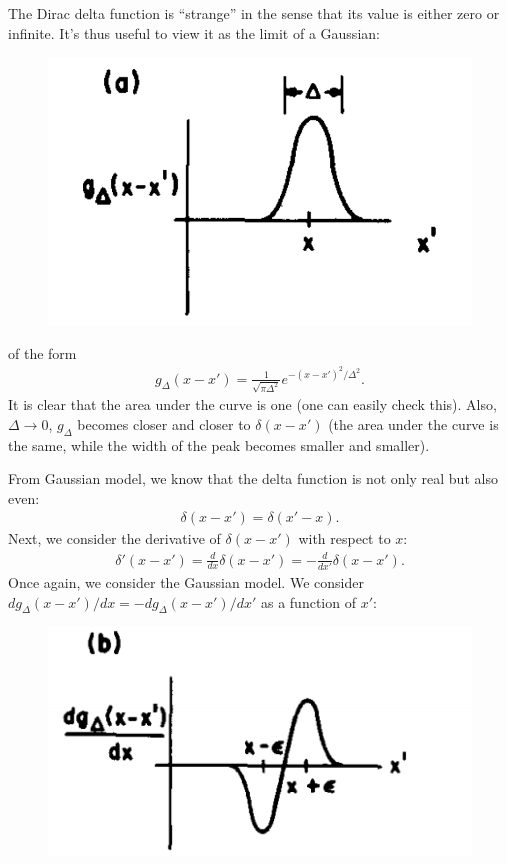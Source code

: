 \documentclass{book}
\theoremstyle{definition}
\newcommand{\f}[2]{\frac{#1}{#2}}
\begin{document}
The Dirac delta function is ``strange'' in the sense that its value is either zero or infinite. It's thus useful to view it as the limit of a Gaussian:
\begin{figure}[!htb]
	\centering
	\includegraphics[scale=0.3]{gauss.png}
\end{figure}

of the form
\begin{align}
g_\Delta(x-x') = \f{1}{\sqrt{\pi \Delta^2}}e^{-(x-x')^2/\Delta^2}.
\end{align}
It is clear that the area under the curve is one (one can easily check this). Also, $\Delta \to 0$, $g_\Delta$ becomes closer and closer to $\delta(x-x')$ (the area under the curve is the same, while the width of the peak becomes smaller and smaller). 


From Gaussian model, we know that the delta function is not only real but also even:
\begin{align}
\delta(x-x') = \delta(x'-x).
\end{align}
Next, we consider the derivative of $\delta(x-x')$ with respect to $x$:
\begin{align}
\delta'(x-x') = \f{d}{dx}\delta(x-x') = -\f{d}{dx'}\delta(x-x').
\end{align}
Once again, we consider the Gaussian model. We consider $dg_\Delta(x-x')/dx = -dg_\Delta(x-x')/dx'$ as a function of $x'$:
\begin{figure}[!htb]
	\centering
	\includegraphics[scale=0.5]{dgauss.png}
\end{figure}
\end{document}
